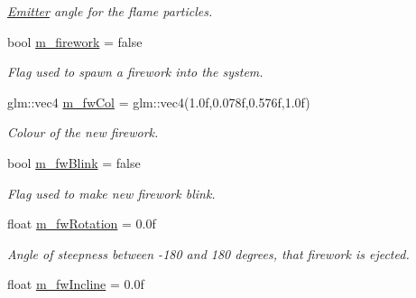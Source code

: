 \begin{DoxyCompactItemize}
\begin{DoxyCompactList}\small\item\em \hyperlink{classEmitter}{Emitter} angle for the flame particles. \end{DoxyCompactList}\item 
\hypertarget{classEmitter_a4e6f9266ac19bf3d185d30284bc43b24}{bool \hyperlink{classEmitter_a4e6f9266ac19bf3d185d30284bc43b24}{m\-\_\-firework} = false}\label{classEmitter_a4e6f9266ac19bf3d185d30284bc43b24}

\begin{DoxyCompactList}\small\item\em Flag used to spawn a firework into the system. \end{DoxyCompactList}\item 
\hypertarget{classEmitter_ad198e73134d1764f120e7e76acf3588b}{glm\-::vec4 \hyperlink{classEmitter_ad198e73134d1764f120e7e76acf3588b}{m\-\_\-fw\-Col} = glm\-::vec4(1.\-0f,0.\-078f,0.\-576f,1.\-0f)}\label{classEmitter_ad198e73134d1764f120e7e76acf3588b}

\begin{DoxyCompactList}\small\item\em Colour of the new firework. \end{DoxyCompactList}\item 
\hypertarget{classEmitter_a37991f5de30d840af13e253b72ea281e}{bool \hyperlink{classEmitter_a37991f5de30d840af13e253b72ea281e}{m\-\_\-fw\-Blink} = false}\label{classEmitter_a37991f5de30d840af13e253b72ea281e}

\begin{DoxyCompactList}\small\item\em Flag used to make new firework blink. \end{DoxyCompactList}\item 
\hypertarget{classEmitter_aa661616d478f33efea14b12add2d13d3}{float \hyperlink{classEmitter_aa661616d478f33efea14b12add2d13d3}{m\-\_\-fw\-Rotation} = 0.\-0f}\label{classEmitter_aa661616d478f33efea14b12add2d13d3}

\begin{DoxyCompactList}\small\item\em Angle of steepness between -\/180 and 180 degrees, that firework is ejected. \end{DoxyCompactList}\item 
\hypertarget{classEmitter_a37cf901dd5727584ee318d228abb9f94}{float \hyperlink{classEmitter_a37cf901dd5727584ee318d228abb9f94}{m\-\_\-fw\-Incline} = 0.\-0f}\label{classEmitter_a37cf901dd5727584ee318d228abb9f94}


\end{DoxyCompactItemize}
